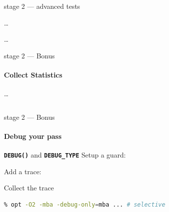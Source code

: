 \documentclass[14pt]{beamer}
\newcommand{\Code}[1]{\textbf{\texttt{#1}}}
\begin{document}
    \begin{frame}[containsverbatim]{stage 2 --- advanced tests}
    \begin{minipage}{\textwidth}
            \scriptsize
            
            \dots
            
            \dots
            
        \end{minipage}
    \end{frame}


    \begin{frame}[containsverbatim]{stage 2 --- Bonus}
        \framesubtitle{Collect Statistics}
        {
        \footnotesize
        
        }
        \vspace{-1em}%
        \dots\\
        \hspace{-2.5em}%
        \begin{minipage}{\textwidth}
            \footnotesize
            
        \end{minipage}

        {
        \footnotesize
\begin{lstlisting}[language=bash]
% opt -load LLVMMBA.so -mba -stats ...
\end{lstlisting}
        }
    \end{frame}

    \begin{frame}[containsverbatim]{stage 2 --- Bonus}
        \framesubtitle{Debug your pass}
        \begin{alertblock}{\Code{DEBUG()} and \Code{DEBUG\_TYPE}}
        Setup a guard:
        {
        \footnotesize
        
        }
        \vspace{-1em}
        Add a trace:\\
        \hspace{-3.5em}%
        \begin{minipage}{\textwidth}
        \footnotesize
        
        \end{minipage}
        \end{alertblock}
        \begin{block}{Collect the trace}
        {
        \footnotesize
        \begin{lstlisting}[language=bash]
% opt -O2 -mba -debug ... # verbose
% opt -O2 -mba -debug-only=mba ... # selective
        \end{lstlisting}
        }
        \end{block}
    \end{frame}
\end{document}
